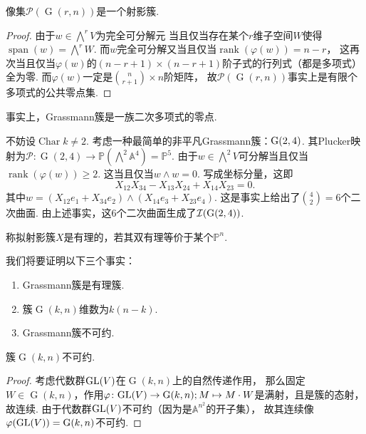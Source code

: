     \begin{proposition}[Grassmann簇]
        像集$\mathcal{P}(\operatorname{G}(r,n))$是一个射影簇.
    \end{proposition}
    \begin{proof}
        由于$w \in \bigwedge\nolimits^{r}V$为完全可分解元
        当且仅当存在某个$r$维子空间$W$使得
        $\operatorname{span}(w) = \bigwedge\nolimits^{r}W$.
        而$w$完全可分解又当且仅当$\operatorname{rank}(\varphi(w))=n-r$，
        这再次当且仅当$\varphi(w)$的$(n-r+1)\times(n-r+1)$阶子式的行列式（都是多项式）全为零.
        而$\varphi(w)$一定是${n \choose r+1} \times n$阶矩阵，
        故$\mathcal{P}(\operatorname{G}(r,n))$事实上是有限个多项式的公共零点集.
    \end{proof}
    
    \begin{remark}
        事实上，Grassmann簇是一族二次多项式的零点. 
    \end{remark}

    \begin{example}
        不妨设$\operatorname{Char} k \neq 2$. 考虑一种最简单的非平凡Grassmann簇：${\rm G}(2,4)$.
        其Plucker映射为$\mathcal{P}\colon\operatorname{G}(2,4) \rightarrow 
        \mathbb{P}(\bigwedge\nolimits^{2}\mathbb{A}^{4})=\mathbb{P}^{5}$.
        由于$w \in \bigwedge\nolimits^{2}V$可分解当且仅当$\operatorname{rank}(\varphi(w)) \geq 2$.
        这当且仅当$w \wedge w = 0$. 写成坐标分量，这即
        \[X_{12}X_{34}-X_{13}X_{24}+X_{14}X_{23}=0.\]
        其中$w=(X_{12}e_{1}+X_{34}e_{2})\wedge(X_{14}e_{3}+X_{23}e_{4})$.
        这是事实上给出了${4 \choose 2}=6$个二次曲面. 由上述事实，这$6$个二次曲面生成了$\mathcal{I}({\rm G}(2,4))$.
    \end{example}

    \begin{definition}
        称拟射影簇$X$是有理的，若其双有理等价于某个$\mathbb{P}^{n}$.
    \end{definition}

    我们将要证明以下三个事实：
    \begin{enumerate}
        \item[(1)] Grassmann簇是有理簇.
        \item[(2)] 簇$\operatorname{G}(k,n)$维数为$k(n-k)$.
        \item[(3)] Grassmann簇不可约.
    \end{enumerate}

    \begin{proposition}
        簇$\operatorname{G}(k,n)$不可约.
    \end{proposition}
    \begin{proof}
        考虑代数群${\rm GL}(V)$在$\operatorname{G}(k,n)$上的自然传递作用，
        那么固定$W \in \operatorname{G}(k,n)$，作用$\varphi\colon {\rm GL}(V) \rightarrow \operatorname{G}(k,n);
        M \mapsto M \cdot W$是满射，且是簇的态射，故连续. 
        由于代数群${\rm GL}(V)$不可约（因为是$\mathbb{A}^{n^{2}}$的开子集），
        故其连续像$\varphi({\rm GL}(V))=\operatorname{G}(k,n)$不可约.
    \end{proof}

